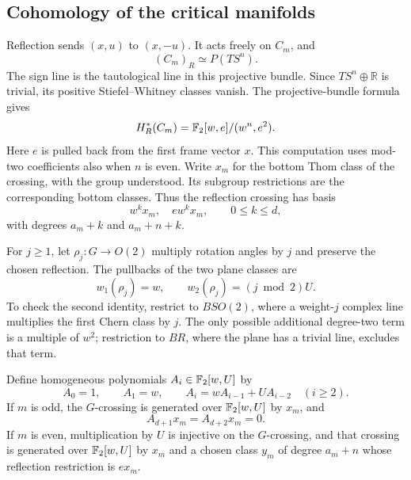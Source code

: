 \subsection{Cohomology of the critical manifolds}

Reflection sends \((x,u)\) to \((x,-u)\).
It acts freely on \(C_m\), and
\[
 (C_m)_R\simeq P(TS^n).
\]
The sign line is the tautological line in this projective bundle.
Since \(TS^n\oplus\mathbb R\) is trivial, its positive
Stiefel--Whitney classes vanish.  The projective-bundle formula gives
\begin{equation}
 H_R^*(C_m)=\mathbb F_2[w,e]/(w^n,e^2).
 \label{eqv:reflection-critical-ring}
\end{equation}
Here \(e\) is pulled back from the first frame vector \(x\).
This computation uses mod-two coefficients also when \(n\) is even.
Write \(x_m\) for the bottom Thom class of the crossing, with the
group understood.  Its subgroup restrictions are the corresponding
bottom classes.
Thus the reflection crossing has basis
\begin{equation}
 w^k x_m,\quad ew^k x_m,\qquad 0\le k\le d,
 \label{eqv:reflection-local-basis}
\end{equation}
with degrees \(a_m+k\) and \(a_m+n+k\).

For \(j\ge1\), let \(\rho_j:G\to O(2)\) multiply rotation angles
by \(j\) and preserve the chosen reflection.
The pullbacks of the two plane classes are
\begin{equation}
 w_1(\rho_j)=w,\qquad w_2(\rho_j)=(j\bmod2)U.
 \label{eqv:weight-classes}
\end{equation}
To check the second identity, restrict to \(BSO(2)\), where a
weight-\(j\) complex line multiplies the first Chern class by \(j\).
The only possible additional degree-two term is a multiple of
\(w^2\); restriction to \(BR\), where the plane has a trivial line,
excludes that term.

\begin{lemma}
\label{eqv:critical-modules}
Define homogeneous polynomials \(A_i\in\mathbb F_2[w,U]\) by
\begin{equation}
 A_0=1,\qquad A_1=w,\qquad
 A_i=wA_{i-1}+UA_{i-2}\quad(i\ge2).
 \label{eqv:grassmann-recurrence}
\end{equation}
If \(m\) is odd, the \(G\)-crossing is generated over
\(\mathbb F_2[w,U]\) by \(x_m\), and
\begin{equation}
 A_{d+1}x_m=A_{d+2}x_m=0.
 \label{eqv:grassmann-relations}
\end{equation}
If \(m\) is even, multiplication by \(U\) is injective on the
\(G\)-crossing, and that crossing is generated over \(\mathbb F_2[w,U]\)
by \(x_m\) and a chosen class \(y_m\) of degree \(a_m+n\)
whose reflection restriction is \(ex_m\).
\end{lemma}

